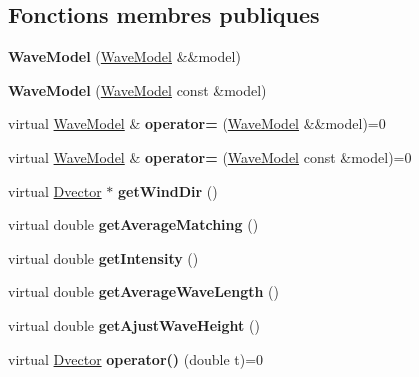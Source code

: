 \subsection*{Fonctions membres publiques}
\begin{DoxyCompactItemize}
\item 
\mbox{\label{class_wave_model_a22d9989890929f0418fcf7f1bd1fe489}} 
{\bfseries Wave\+Model} (\hyperlink{class_wave_model}{Wave\+Model} \&\&model)
\item 
\mbox{\label{class_wave_model_a1991dab09a570054adffc3677e218556}} 
{\bfseries Wave\+Model} (\hyperlink{class_wave_model}{Wave\+Model} const \&model)
\item 
\mbox{\label{class_wave_model_a3b52480b59f4c5f3d0d749d400f9e14c}} 
virtual \hyperlink{class_wave_model}{Wave\+Model} \& {\bfseries operator=} (\hyperlink{class_wave_model}{Wave\+Model} \&\&model)=0
\item 
\mbox{\label{class_wave_model_a3794a5af00e6f216009fd8b54d48caf3}} 
virtual \hyperlink{class_wave_model}{Wave\+Model} \& {\bfseries operator=} (\hyperlink{class_wave_model}{Wave\+Model} const \&model)=0
\item 
\mbox{\label{class_wave_model_abe94f9621e5aaca300d8312479051710}} 
virtual \hyperlink{class_dvector}{Dvector} $\ast$ {\bfseries get\+Wind\+Dir} ()
\item 
\mbox{\label{class_wave_model_a829250f96303b3e9ddd9c2c6cbb0e3be}} 
virtual double {\bfseries get\+Average\+Matching} ()
\item 
\mbox{\label{class_wave_model_ab72286fdfe57cebaae70af46c69dacb1}} 
virtual double {\bfseries get\+Intensity} ()
\item 
\mbox{\label{class_wave_model_af73c7bfe6c6c2d1546e7aaa966879ca3}} 
virtual double {\bfseries get\+Average\+Wave\+Length} ()
\item 
\mbox{\label{class_wave_model_a6ce936ce9c4d27170bd0f7a6cd28b31f}} 
virtual double {\bfseries get\+Ajust\+Wave\+Height} ()
\item 
\mbox{\label{class_wave_model_a7b0364bc993813fa92efbf84de84819c}} 
virtual \hyperlink{class_dvector}{Dvector} {\bfseries operator()} (double t)=0
\end{DoxyCompactItemize}


